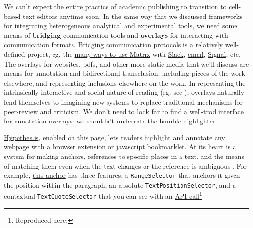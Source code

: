 \documentclass[10pt]{article}
\begin{document}
\begin{multicols}{2}
We can't expect the entire practice of academic publishing to transition
to cell-based text editors anytime soon. In the same way that we
discussed frameworks for integrating heterogeneous analytical and
experimental tools, we need some means of \textbf{bridging}
communication tools and \textbf{overlays} for interacting with
communication formats. Bridging communication protocols is a relatively
well-defined project, eg. the \href{https://matrix.org/bridges/}{many
ways to use Matrix} with
\href{https://matrix.org/bridges/\#slack}{Slack},
\href{https://matrix.org/bridges/\#email}{email},
\href{https://matrix.org/bridges/\#signal}{Signal}, etc. The overlays
for websites, pdfs, and other more static media that we'll discuss are
means for annotation and bidirectional transclusion: including pieces of
the work elsewhere, and representing inclusions elsewhere on the work.
In representing the intrinsically interactive and social nature of
reading (eg. see \cite{jacksonMarginaliaReadersWriting2001} ),
overlays naturally lend themselves to imagining new systems to replace
traditional mechanisms for peer-review and criticism. We don't need to
look far to find a well-trod interface for annotation overlays: we
shouldn't underrate the humble highlighter.

\href{https://hypothes.is}{Hypothes.is}, enabled on this page, lets
readers highlight and annotate any webpage with a
\href{https://chrome.google.com/webstore/detail/hypothesis-web-pdf-annota/bjfhmglciegochdpefhhlphglcehbmek}{browser
extension} or javascript bookmarklet. At its heart is a system for
making anchors, references to specific places in a text, and the means
of matching them even when the text changes or the reference is
ambiguous \cite{csillagFuzzyAnchoring2013} . For example,
\href{https://hypothes.is/a/oLw4uk7_Eeyt5N-FVlE3fw}{this anchor} has
three features, a \texttt{RangeSelector} that anchors it given the
position within the paragraph, an absolute
\texttt{TextPositionSelector}, and a contextual
\texttt{TextQuoteSelector} that you can see with an
\href{https://api.hypothes.is/api/annotations/oLw4uk7_Eeyt5N-FVlE3fw}{API
call}\footnote{Reproduced here:

}
\end{multicols}
\end{document}
